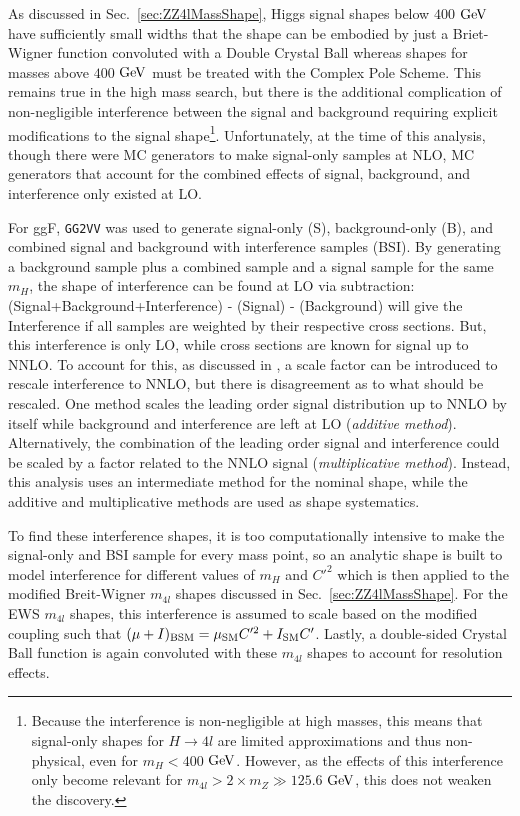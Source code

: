 As discussed in Sec.~\ref{sec:ZZ4lMassShape}, Higgs signal shapes below $400$ $\rm{GeV}$ have sufficiently small widths that the shape can be embodied by just a Briet-Wigner function convoluted with a Double Crystal Ball whereas shapes for masses above $400$ $\rm{GeV}$ must be treated with the Complex Pole Scheme. This remains true in the high mass search, but there is the additional complication of non-negligible interference between the signal and background \cite{Passarino:2012ri} requiring explicit modifications to the signal shape\footnote{Because the interference is non-negligible at high masses, this means that signal-only shapes for $H\rightarrow 4l$ are limited approximations and thus non-physical, even for $m_{H}<400$ $\rm{GeV}$. However, as the effects of this interference only become relevant for $m_{4l} > 2\times m_{Z} \gg 125.6$ $\rm{GeV}$, this does not weaken the discovery.}. Unfortunately, at the time of this analysis, though there were MC generators to make signal-only samples at NLO, MC generators that account for the combined effects of signal, background, and interference only existed at LO.

For ggF, {\tt GG2VV} was used to generate signal-only (S), background-only (B), and combined signal and background with interference samples (BSI). By generating a background sample plus a combined sample and a signal sample for the same $m_H$, the shape of interference can be found at LO via subtraction: (Signal+Background+Interference) - (Signal) - (Background) will give the Interference if all samples are weighted by their respective cross sections. But, this interference is only LO, while cross sections are known for signal up to NNLO. To account for this, as discussed in \cite{HXSWG_Properties}, a scale factor can be introduced to rescale interference to NNLO, but there is disagreement as to what should be rescaled. One method scales the leading order signal distribution up to NNLO by itself while background and interference are left at LO (\textit{additive method}). Alternatively, the combination of the leading order signal and interference could be scaled by a factor related to the NNLO signal (\textit{multiplicative method}). Instead, this analysis uses an intermediate method for the nominal shape, while the additive and multiplicative methods are used as shape systematics.

To find these interference shapes, it is too computationally intensive to make the signal-only and BSI sample for every mass point, so an analytic shape is built to model interference for different values of $m_{H}$ and $C'^2$ which is then applied to the modified Breit-Wigner $m_{4l}$ shapes discussed in Sec.~\ref{sec:ZZ4lMassShape}. For the EWS $m_{4l}$ shapes, this interference is assumed to scale based on the modified coupling such that $(\mu + I)_{\rm{BSM}} = \mu_{\rm{SM}}C'^2 + I_{\rm{SM}}C'$. Lastly, a double-sided Crystal Ball function is again convoluted with these $m_{4l}$ shapes to account for resolution effects. 

